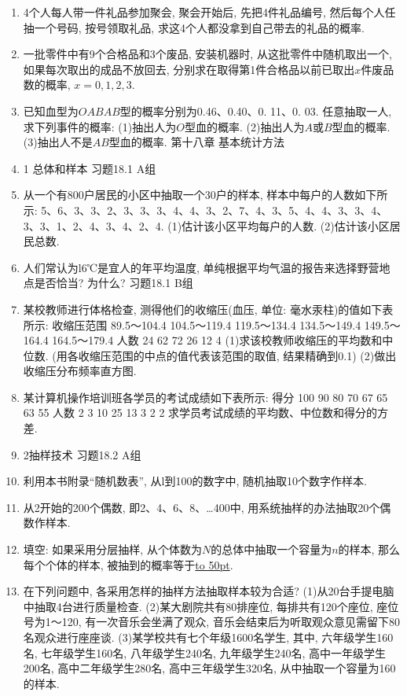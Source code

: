 \documentclass[10pt,a4paper]{article}
\newcommand{\blank}[1]{\underline{\hbox to #1pt{}}}
\begin{document}
\begin{enumerate}[1.]
(l)高一(1)班在工作委员会中有代表.
(2)每个班级在工作委员会中都有代表.
复习题
B组
\item 4个人每人带一件礼品参加聚会, 聚会开始后, 先把4件礼品编号, 然后每个人任抽一个号码, 按号领取礼品, 求这4个人都没拿到自己带去的礼品的概率.
\item 一批零件中有9个合格品和3个废品, 安装机器时, 从这批零件中随机取出一个, 如果每次取出的成品不放回去, 分别求在取得第1件合格品以前已取出$x$件废品数的概率, $x=0,1,2,3$.
\item 已知血型为$OABAB$型的概率分别为0.46、0.40、0. 11、0. 03. 任意抽取一人, 求下列事件的概率:
(1)抽出人为$O$型血的概率.
(2)抽出人为$A$或$B$型血的概率.
(3)抽出人不是$AB$型血的概率.
第十八章  基本统计方法
\item 1  总体和样本
习题18.1   A组
\item 从一个有800户居民的小区中抽取一个30户的样本, 样本中每户的人数如下所示: 5、6、3、3、2、3、3、3、4、4、3、2、7、4、3、5、4、4、3、3、4、3、3、1、2、4、3、4、2、4.
(1)估计该小区平均每户的人数.
(2)估计该小区居民总数.
\item 人们常认为l6℃是宜人的年平均温度, 单纯根据平均气温的报告来选择野营地点是否恰当? 为什么?
习题18.1   B组
\item 某校教师进行体格检查, 测得他们的收缩压(血压, 单位: 毫水汞柱)的值如下表所示:
收缩压范围	89.5～104.4	104.5～119.4	119.5～134.4	134.5～149.4	149.5～164.4	164.5～179.4
人数	24	62	72	26	12	4
(1)求该校教师收缩压的平均数和中位数. (用各收缩压范围的中点的值代表该范围的取值, 结果精确到0.1)
(2)做出收缩压分布频率直方图.
\item 某计算机操作培训班各学员的考试成绩如下表所示:
得分	100	90	80	70	67	65	63	55
人数	2	3	10	25	13	3	2	2
求学员考试成绩的平均数、中位数和得分的方差.
\item 2抽样技术
习题18.2 A组
\item 利用本书附录``随机数表'', 从l到100的数字中, 随机抽取10个数字作样本.
\item 从2开始的200个偶数, 即2、4、6、8、…400中, 用系统抽样的办法抽取20个偶数作样本.
\item 填空:
如果采用分层抽样, 从个体数为$N$的总体中抽取一个容量为$n$的样本, 那么每个个体的样本, 被抽到的概率等于\blank{50}.
\item 在下列问题中, 各采用怎样的抽样方法抽取样本较为合适?
(1)从20台手提电脑中抽取4台进行质量检查.
(2)某大剧院共有80排座位, 每排共有120个座位, 座位号为1～120, 有一次音乐会坐满了观众, 音乐会结束后为听取观众意见需留下80名观众进行座座谈.
(3)某学校共有七个年级1600名学生, 其中, 六年级学生160名, 七年级学生160名, 八年级学生240名, 九年级学生240名, 高中一年级学生200名, 高中二年级学生280名, 高中三年级学生320名, 从中抽取一个容量为160的样本.

\end{enumerate}
\end{document}
